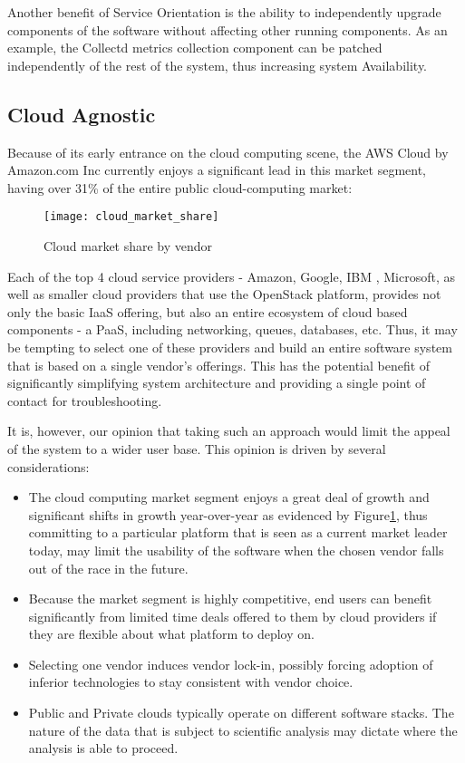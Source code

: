 Another benefit of Service Orientation is the ability to independently upgrade components of the software without affecting other running components. As an example, the Collectd metrics collection component can be patched independently of the rest of the system, thus increasing system Availability.

\subsection {Cloud Agnostic}

Because of its early entrance on the cloud computing scene, the AWS Cloud by Amazon.com Inc currently enjoys a significant lead in this market segment, having over 31\% of the entire public cloud-computing market:

\begin{figure}[h]
\texttt{[image: cloud\_market\_share]}
\centering
\caption {Cloud market share by vendor}
\label{fig:cloud_market_share}
\end{figure}

Each of the top 4 cloud service providers - Amazon, Google, IBM , Microsoft, as well as smaller cloud providers that use the OpenStack platform, provides not only the basic IaaS offering, but also an entire ecosystem of cloud based components - a PaaS, including networking, queues, databases, etc. Thus, it may be tempting to select one of these providers and build an entire software system that is based on a single vendor's offerings. This has the potential benefit of significantly simplifying system architecture and providing a single point of contact for troubleshooting.

It is, however, our opinion that taking such an approach would limit the appeal of the system to a wider user base. This opinion is driven by several considerations:

\begin{itemize}
\item The cloud computing market segment enjoys a great deal of growth and significant shifts in growth year-over-year as evidenced by Figure\ref{fig:cloud_market_share}, thus committing to a particular platform that is seen as a current market leader today, may limit the usability of the software when the chosen vendor falls out of the race in the future.
\item Because the market segment is highly competitive, end users can benefit significantly from limited time deals offered to them by cloud providers if they are flexible about what platform to deploy on.
\item Selecting one vendor induces vendor lock-in, possibly forcing adoption of inferior technologies to stay consistent with vendor choice.
\item Public and Private clouds typically operate on different software stacks. The nature of the data that is subject to scientific analysis may dictate where the analysis is able to proceed. 
\end{itemize}

